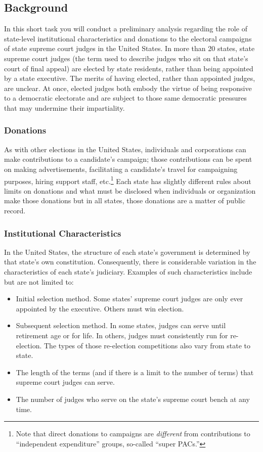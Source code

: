 \documentclass[11pt, letterpaper, twoside]{article}
\begin{document}
\subsection*{Background}
In this short task you will conduct a preliminary analysis regarding the role of state-level institutional characteristics and donations to the electoral campaigns of state supreme court judges in the United States. In more than 20 states, state supreme court judges (the term used to describe judges who sit on that state's court of final appeal) are elected by state residents, rather than being appointed by a state executive. The merits of having elected, rather than appointed judges, are unclear. At once, elected judges both embody the virtue of being responsive to a democratic electorate and are subject to those same democratic pressures that may undermine their impartiality. 

\subsubsection*{Donations}
As with other elections in the United States, individuals and corporations can make contributions to a candidate's campaign; those contributions can be spent on making advertisements, facilitating a candidate's travel for campaigning purposes, hiring support staff, etc.\footnote{Note that direct donations to campaigns are \textit{different} from contributions to ``independent expenditure'' groups, so-called ``super PACs.''} Each state has slightly different rules about limits on donations and what must be disclosed when individuals or organization make those donations but in all states, those donations are a matter of public record.

\subsubsection*{Institutional Characteristics}
In the United States, the structure of each state's government is determined by that state's own constitution. Consequently, there is considerable variation in the characteristics of each state's judiciary. Examples of such characteristics include but are not limited to:
\begin{itemize}
    \item Initial selection method. Some states' supreme court judges are only ever appointed by the executive. Others must win election.
    \item Subsequent selection method. In some states, judges can serve until retirement age or for life. In others, judges must consistently run for re-election. The types of those re-election competitions also vary from state to state.
    \item The length of the terms (and if there is a limit to the number of terms) that supreme court judges can serve.
    \item The number of judges who serve on the state's supreme court bench at any time.
\end{itemize}
\end{document}
